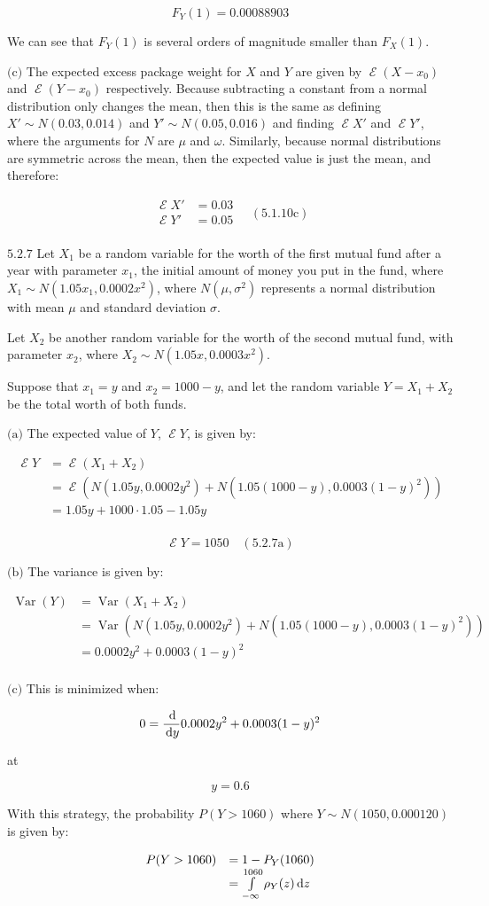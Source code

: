\documentclass{article}
\newcommand{\problem}[2]{$\boxed{\text{#1.#2}}$}
\newcommand{\subproblem}[3]{$\boxed{\text{(#3)}}$}
\newcommand{\subsolution}[4]{\boxed{#4\quad(\text{#1.#2#3})}}
\renewcommand{\d}[1]{\,\textnormal{d}#1}
\newcommand{\dd}[2]{\frac{\d{#1}}{\d{#2}}}
\newcommand{\multistep}[1]{\begin{array}{rl} #1 \end{array}}
\DeclareMathOperator{\var}{Var}
\DeclareMathOperator{\E}{\mathcal{E}}
\begin{document}
\[
F_Y(1)=0.00088903
\]

We can see that $F_Y(1)$ is several orders of magnitude smaller than
$F_X(1)$.

%
\subproblem{5.1}{10}{c} The expected excess package weight for $X$ and
$Y$ are given by $\E(X-x_0)$ and $\E(Y-x_0)$ respectively. Because
subtracting a constant from a normal distribution only changes the
mean, then this is the same as defining $X'\sim{}N(0.03,0.014)$ and
$Y'\sim{}N(0.05,0.016)$ and finding $\E{}X'$ and $\E{}Y'$, where the
arguments for $N$ are $\mu$ and $\omega$. Similarly, because normal
distributions are symmetric across the mean, then the expected value
is just the mean, and therefore:

\[
\subsolution{5.1}{10}{c}{\multistep{
\E X'&=0.03 \\
\E Y'&=0.05 \\
}}
\]

%
\problem{5.2}{7} Let $X_1$ be a random variable for the worth of the
first mutual fund after a year with parameter $x_1$, the initial
amount of money you put in the fund, where
$X_1\sim{}N(1.05x_1,0.0002x^2)$, where $N(\mu,\sigma^2)$ represents a
normal distribution with mean $\mu$ and standard deviation $\sigma$.

Let $X_2$ be another random variable for the worth of the second
mutual fund, with parameter $x_2$, where
$X_2\sim{}N(1.05x,0.0003x^2)$.

Suppose that $x_1=y$ and $x_2=1000-y$, and let the random variable
$Y=X_1+X_2$ be the total worth of both funds.

%
\subproblem{5.2}{7}{a} The expected value of $Y$, $\E{}Y$, is given
by:

\[
\multistep{
\E Y&=\E(X_1+X_2) \\
&=\E(N(1.05y,0.0002y^2)+N(1.05(1000-y),0.0003(1-y)^2)) \\
&=1.05y+1000\cdot1.05-1.05y \\
}
\]

\[
\subsolution{5.2}{7}{a}{\E Y=1050}
\]

%
\subproblem{5.2}{7}{b} The variance is given by:

\[
\multistep{
\var(Y)&=\var(X_1+X_2) \\
&=\var(N(1.05y,0.0002y^2)+N(1.05(1000-y),0.0003(1-y)^2)) \\
&=0.0002y^2+0.0003(1-y)^2 \\
}
\]

%
\subproblem{5.2}{7}{c} This is minimized when:

\[
0=\dd{}{y}0.0002y^2+0.0003(1-y)^2
\]

at

\[
y=0.6
\]

With this strategy, the probability $P(Y>1060)$ where
$Y\sim{}N(1050,0.000120)$ is given by:

\[
\multistep{
P(Y>1060)&=1-P_Y(1060) \\
&=\int\limits_{-\infty}^{1060} \rho_Y(z)\d{z} \\
}
\]
\end{document}
